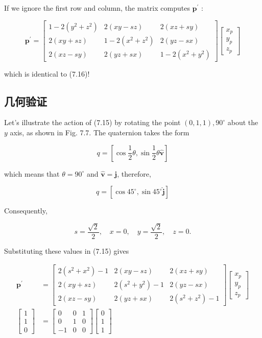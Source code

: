 If we ignore the first row and column, the matrix computes $\mathbf{p}^{\prime}$ :

$$
\mathbf{p}^{\prime}=\left[\begin{array}{ccc}
1-2\left(y^{2}+z^{2}\right) & 2(x y-s z) & 2(x z+s y) \\
2(x y+s z) & 1-2\left(x^{2}+z^{2}\right) & 2(y z-s x) \\
2(x z-s y) & 2(y z+s x) & 1-2\left(x^{2}+y^{2}\right)
\end{array}\right]\left[\begin{array}{l}
x_{p} \\
y_{p} \\
z_{p}
\end{array}\right]
$$

which is identical to (7.16)!

\subsection{几何验证}
Let's illustrate the action of (7.15) by rotating the point $(0,1,1), 90^{\circ}$ about the $y$ axis, as shown in Fig. 7.7. The quaternion takes the form

$$
q=\left[\cos \frac{1}{2} \theta, \sin \frac{1}{2} \theta \hat{\mathbf{v}}\right]
$$

which means that $\theta=90^{\circ}$ and $\hat{\mathbf{v}}=\mathbf{j}$, therefore,

$$
q=\left[\cos 45^{\circ}, \sin 45^{\circ} \hat{\mathbf{j}}\right]
$$

Consequently,

$$
s=\frac{\sqrt{2}}{2}, \quad x=0, \quad y=\frac{\sqrt{2}}{2}, \quad z=0 .
$$

Substituting these values in (7.15) gives

$$
\begin{aligned}
\mathbf{p}^{\prime} & =\left[\begin{array}{ccc}
2\left(s^{2}+x^{2}\right)-1 & 2(x y-s z) & 2(x z+s y) \\
2(x y+s z) & 2\left(s^{2}+y^{2}\right)-1 & 2(y z-s x) \\
2(x z-s y) & 2(y z+s x) & 2\left(s^{2}+z^{2}\right)-1
\end{array}\right]\left[\begin{array}{l}
x_{p} \\
y_{p} \\
z_{p}
\end{array}\right] \\
{\left[\begin{array}{l}
1 \\
1 \\
0
\end{array}\right] } & =\left[\begin{array}{ccc}
0 & 0 & 1 \\
0 & 1 & 0 \\
-1 & 0 & 0
\end{array}\right]\left[\begin{array}{l}
0 \\
1 \\
1
\end{array}\right]
\end{aligned}
$$

